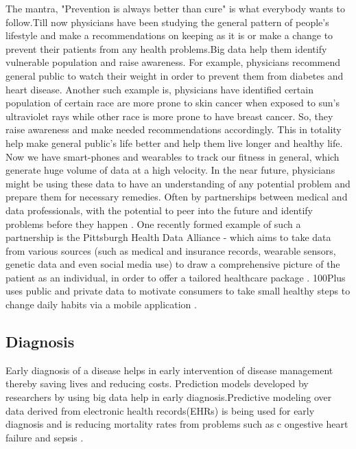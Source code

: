 \documentclass[sigconf]{acmart}
\begin{document}
The mantra, "Prevention is always better than cure" is what everybody
wants to follow.Till now physicians have been studying the general pattern of people's lifestyle and make a recommendations on 
keeping as it is or make a change to prevent their patients from any health problems.Big data help them identify vulnerable 
population and raise awareness. For example, physicians recommend general public to watch their weight in order to prevent them 
from diabetes and heart disease. Another such example is, physicians have identified certain population of certain race are more
prone to skin cancer when exposed to sun's ultraviolet rays while other race is more prone to have breast cancer. So, they 
raise awareness and make needed recommendations accordingly. This in totality help make general public's life better and help them live
longer and healthy life. Now we have smart-phones and wearables to track our fitness in general, which generate huge volume of data 
at a high velocity. In the near future, physicians might be using these data to have an understanding of any potential problem 
and prepare them for necessary remedies. Often by partnerships between medical and data professionals, with the potential to peer 
into the future and identify problems before they happen \cite{www-forbes-com}. One recently formed example of such a partnership is 
the Pittsburgh Health Data Alliance - which aims to take data from various sources (such as medical and insurance records, 
wearable sensors, genetic data and even social media use) to draw a comprehensive picture of the patient as an individual, in order 
to offer a tailored healthcare package \cite{www-forbes-com}. 100Plus uses public and private data to motivate consumers to take 
small healthy steps to change daily habits via a mobile application \cite{www-ghdonline-org}.  

 

\subsection{Diagnosis}
Early diagnosis of a disease helps in early intervention of disease management thereby saving lives and reducing costs. 
Prediction models developed by researchers by using big data help in early diagnosis.Predictive modeling over data derived 
from electronic health records(EHRs) is being used for early diagnosis and is reducing mortality rates from problems such as c
ongestive heart failure and sepsis \cite{www-mapr-com}.
\end{document}
